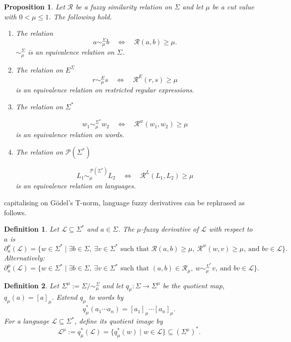 \documentclass{article}
\newcommand{\cR}{{\mathcal R}}
\def\cut{\mu}
\newtheorem{definition}{Definition}[section]
\newtheorem{proposition}{Proposition}[section]
\begin{document}
\begin{proposition}\label{prop:cut-equivalence}
Let $\cR$ be a fuzzy similarity relation on $\Sigma$ and let $\cut$ be a cut value
with $0 < \cut \le 1$.
The following hold. 
\begin{enumerate}
\item  The relation \[
  a \sim_\cut^\Sigma b \quad\Longleftrightarrow\quad \cR(a,b)\ge \cut.
\]$\sim_\cut^\Sigma$ is an equivalence relation on $\Sigma$. 
\item The relation  on $E^\Sigma$
\[
  r\sim_\cut^E s
  \quad\Longleftrightarrow\quad
  \mathcal R^E(r,s)\ge\cut
\]
 is an equivalence relation on restricted regular expressions.
\item The relation on $\Sigma^\ast$

\[
  w_1\sim_\cut^{\Sigma^*}w_2
  \quad\Longleftrightarrow\quad
  \mathcal R^w(w_1,w_2)\ge\cut
\]
 is an equivalence relation on words.
\item The relation on $\mathcal P(\Sigma^\ast)$

\[
  L_1\sim_\cut^{\mathcal P(\Sigma^*)}L_2
  \quad\Longleftrightarrow\quad
  \mathcal R^L(L_1,L_2)\ge\cut
\]
is an equivalence relation on languages. 
\end{enumerate}
\end{proposition}

capitalising on G\"odel's T-norm, language fuzzy derivatives can be rephrased as follows.

\begin{definition}\label{fuzzyderivativeGodel}
Let $\mathcal{L}\subseteq\Sigma^*$ and $a\in\Sigma$. The \emph{$\cut$-fuzzy
derivative} of $\mathcal{L}$ with respect to $a$ is
$$
\partial_a^\cut(\mathcal{L})
=
\{w \in \Sigma^* \mid
  \exists b \in \Sigma,\ \exists v\in\Sigma^*
  \text{ such that }
  \cR(a,b) \ge \cut,\ \mathcal{R}^w(w,v)\ge\cut,\ \text{and } bv \in \mathcal{L}
\}.
$$
Alternatively:
$$
\partial_a^\cut(\mathcal{L})
=
\{w \in \Sigma^* \mid
  \exists b \in \Sigma,\ \exists v\in\Sigma^*
  \text{ such that }
  (a,b)\in\cR_\cut,\ w\sim_\cut^{\Sigma^*}v,\ \text{and } bv\in\mathcal{L}
\}.
$$
\end{definition}


\begin{definition}\label{def:quotient-language-fuzzy}
Let $\Sigma^\cut := \Sigma/{\sim_\cut^\Sigma}$ and let
$q_\cut:\Sigma\to\Sigma^\cut$ be the quotient map, $q_\cut(a)=[a]_\cut$.
Extend $q_\cut$ to words by
\[
  q_\cut^*(a_1\cdots a_n) = [a_1]_\cut \cdots [a_n]_\cut.
\]
For a language $\mathcal L \subseteq \Sigma^*$, define its quotient image by
\[
  \mathcal L^\cut := q_\cut^*(\mathcal L)
  = \{q_\cut^*(w)\mid w\in\mathcal L\}
  \subseteq (\Sigma^\cut)^*.
\]
\end{definition}
\end{document}
